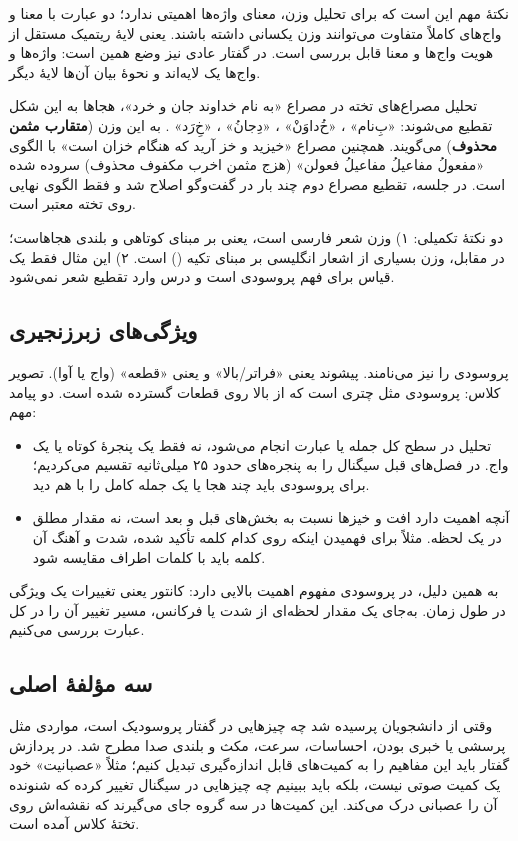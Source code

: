 نکتهٔ مهم این است که برای تحلیل وزن، معنای واژه‌ها اهمیتی ندارد؛ دو عبارت با معنا و واج‌های کاملاً متفاوت می‌توانند وزن یکسانی داشته باشند. یعنی لایهٔ ریتمیک مستقل از هویت واج‌ها و معنا قابل بررسی است. در گفتار عادی نیز وضع همین است: واژه‌ها و واج‌ها یک لایه‌اند و نحوهٔ بیان آن‌ها لایهٔ دیگر.

\begin{addedbox}{تحلیل مصراع‌های تخته}
در مصراع «به نام خداوند جان و خرد»، هجاها به این شکل تقطیع می‌شوند: «بِ‌نا‌م»  ، «خُ‌دا‌وَنْ»  ، «دِ‌جا‌نُ»  ، «خِ‌رَد» . به این وزن (\textbf{متقارب مثمن محذوف}) می‌گویند. همچنین مصراع «خیزید و خز آرید که هنگام خزان است» با الگوی «مفعولُ مفاعیلُ مفاعیلُ فعولن» (هزج مثمن اخرب مکفوف محذوف) سروده شده است. در جلسه، تقطیع مصراع دوم چند بار در گفت‌وگو اصلاح شد و فقط الگوی نهایی روی تخته معتبر است.

دو نکتهٔ تکمیلی: ۱) وزن شعر فارسی  است، یعنی بر مبنای کوتاهی و بلندی هجاهاست؛ در مقابل، وزن بسیاری از اشعار انگلیسی بر مبنای تکیه () است. ۲) این مثال فقط یک قیاس برای فهم پروسودی است و درس وارد تقطیع شعر نمی‌شود.
\end{addedbox}

\subsection{ویژگی‌های زبرزنجیری}
پروسودی را  نیز می‌نامند. پیشوند  یعنی «فراتر/بالا» و  یعنی «قطعه» (واج یا آوا). تصویر کلاس: پروسودی مثل چتری است که از بالا روی قطعات گسترده شده است. دو پیامد مهم:
\begin{itemize}
  \item تحلیل در سطح کل جمله یا عبارت انجام می‌شود، نه فقط یک پنجرهٔ کوتاه یا یک واج. در فصل‌های قبل سیگنال را به پنجره‌های حدود ۲۵ میلی‌ثانیه تقسیم می‌کردیم؛ برای پروسودی باید چند هجا یا یک جمله کامل را با هم دید.
  \item آنچه اهمیت دارد افت و خیزها نسبت به بخش‌های قبل و بعد است، نه مقدار مطلق در یک لحظه. مثلاً برای فهمیدن اینکه روی کدام کلمه تأکید شده، شدت و آهنگ آن کلمه باید با کلمات اطراف مقایسه شود.
\end{itemize}

به همین دلیل، در پروسودی مفهوم  اهمیت بالایی دارد: کانتور یعنی تغییرات یک ویژگی در طول زمان. به‌جای یک مقدار لحظه‌ای از شدت یا فرکانس، مسیر تغییر آن را در کل عبارت بررسی می‌کنیم.

\subsection{سه مؤلفهٔ اصلی}
وقتی از دانشجویان پرسیده شد چه چیزهایی در گفتار پروسودیک است، مواردی مثل پرسشی یا خبری بودن، احساسات، سرعت، مکث و بلندی صدا مطرح شد. در پردازش گفتار باید این مفاهیم را به کمیت‌های قابل اندازه‌گیری تبدیل کنیم؛ مثلاً «عصبانیت» خود یک کمیت صوتی نیست، بلکه باید ببینیم چه چیزهایی در سیگنال تغییر کرده که شنونده آن را عصبانی درک می‌کند. این کمیت‌ها در سه گروه جای می‌گیرند که نقشه‌اش روی تختهٔ کلاس آمده است.

